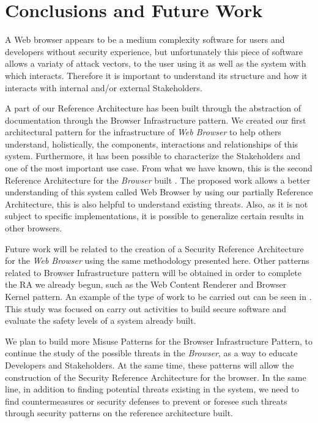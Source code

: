 \documentclass{sig-alternate-05-2015}
\begin{document}
\section*{Conclusions and Future Work}
A Web browser appears to be a medium complexity software for users and developers without security experience, but unfortunately this piece of software allows a variaty of attack vectors, to the user using it as well as the system with which interacts. Therefore it is important to understand its structure and how it interacts with internal and/or external Stakeholders.

A part of our Reference Architecture has been built through the abstraction of documentation through the Browser Infrastructure pattern. We created our first architectural pattern for the infrastructure of \textit{Web Browser} to help others understand, holistically, the components, interactions and relationships of this system. Furthermore, it has been possible to characterize the Stakeholders and one of the most important use case. From what we have known, this is the second Reference Architecture for the \textit{Browser} built \cite{2005-grosskurth-browser-refarch}. The proposed work allows a better understanding of this system called Web Browser by using our partially Reference Architecture, this is also helpful to understand existing threats. Also, as it is not subject to specific implementations, it is possible to generalize certain results in other browsers.

Future work will be related to the creation of a Security Reference Architecture for the \textit{Web Browser} using the same methodology presented here. Other patterns related to Browser Infrastructure pattern will be obtained in order to complete the RA we already begun, such as the Web Content Renderer and Browser Kernel pattern. An example of the type of work to be carried out can be seen in \cite{Fernandez2015}. This study was focused on carry out activities to build secure software and evaluate the safety levels of a system already built.

We plan to build more Misuse Patterns for the Browser Infrastructure Pattern, to continue the study of the possible threats in the \textit{Browser}, as a way to educate Developers and Stakeholders. At the same time, these patterns will allow the construction of the Security Reference Architecture for the browser. In the same line, in addition to finding potential threats existing in the system, we need to find countermeasures or security defenses to prevent or foresee such threats through security patterns on the reference architecture built.

  

\end{document}
